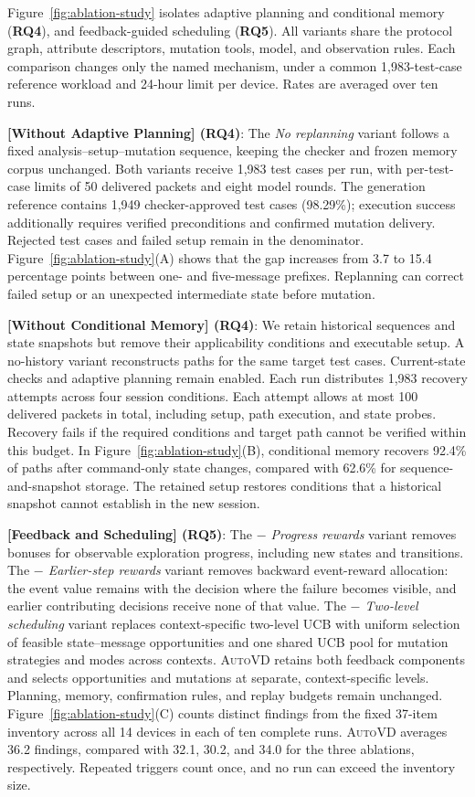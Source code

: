 \documentclass[10pt,journal,compsoc]{IEEEtran}
\newcommand{\system}{\textsc{AutoVD}}
\DeclareRobustCommand{\rq}[1]{\textcolor{rqcolor}{\textbf{RQ#1}}}
\begin{document}
Figure~\ref{fig:ablation-study} isolates adaptive planning and conditional memory (\rq{4}), and feedback-guided scheduling (\rq{5}). All variants share the protocol graph, attribute descriptors, mutation tools, model, and observation rules. Each comparison changes only the named mechanism, under a common 1{,}983-test-case reference workload and 24-hour limit per device. Rates are averaged over ten runs.

\noindent\textbf{[Without Adaptive Planning] (\rq{4})}:
The \emph{No replanning} variant follows a fixed analysis--setup--mutation sequence, keeping the checker and frozen memory corpus unchanged. Both variants receive 1{,}983 test cases per run, with per-test-case limits of 50 delivered packets and eight model rounds. The generation reference contains 1{,}949 checker-approved test cases (98.29\%); execution success additionally requires verified preconditions and confirmed mutation delivery. Rejected test cases and failed setup remain in the denominator. Figure~\ref{fig:ablation-study}(A) shows that the gap increases from 3.7 to 15.4 percentage points between one- and five-message prefixes. Replanning can correct failed setup or an unexpected intermediate state before mutation.

\noindent\textbf{[Without Conditional Memory] (\rq{4})}:
We retain historical sequences and state snapshots but remove their applicability conditions and executable setup. A no-history variant reconstructs paths for the same target test cases. Current-state checks and adaptive planning remain enabled. Each run distributes 1{,}983 recovery attempts across four session conditions. Each attempt allows at most 100 delivered packets in total, including setup, path execution, and state probes. Recovery fails if the required conditions and target path cannot be verified within this budget. In Figure~\ref{fig:ablation-study}(B), conditional memory recovers 92.4\% of paths after command-only state changes, compared with 62.6\% for sequence-and-snapshot storage. The retained setup restores conditions that a historical snapshot cannot establish in the new session.

\noindent\textbf{[Feedback and Scheduling] (\rq{5})}:
The \emph{$-$ Progress rewards} variant removes bonuses for observable exploration progress, including new states and transitions. The \emph{$-$ Earlier-step rewards} variant removes backward event-reward allocation: the event value remains with the decision where the failure becomes visible, and earlier contributing decisions receive none of that value. The \emph{$-$ Two-level scheduling} variant replaces context-specific two-level UCB with uniform selection of feasible state--message opportunities and one shared UCB pool for mutation strategies and modes across contexts. \system{} retains both feedback components and selects opportunities and mutations at separate, context-specific levels. Planning, memory, confirmation rules, and replay budgets remain unchanged. Figure~\ref{fig:ablation-study}(C) counts distinct findings from the fixed 37-item inventory across all 14 devices in each of ten complete runs. \system{} averages 36.2 findings, compared with 32.1, 30.2, and 34.0 for the three ablations, respectively. Repeated triggers count once, and no run can exceed the inventory size.
\end{document}
